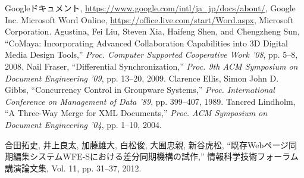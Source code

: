\renewcommand{\bibname}{参考文献}
\begin{thebibliography}{Longest9}

Googleドキュメント, \url{https://www.google.com/intl/ja_jp/docs/about/}, Google Inc.
Microsoft Word Online, \url{https://office.live.com/start/Word.aspx}, Microsoft Corporation.
Agustina, Fei Liu, Steven Xia, Haifeng Shen, and Chengzheng Sun, ``CoMaya: Incorporating Advanced Collaboration Capabilities into 3D Digital Media Design Tools,'' {\it Proc. Computer Supported Cooperative Work '08}, pp. 5--8, 2008.
Nail Fraser,	``Differential Synchronization,''  {\it Proc. 9th ACM Symposium on Document Engineering '09}, pp. 13--20, 2009.
Clarence Ellis, Simon John D. Gibbs, ``Concurrency Control in Groupware Systems,'' {\it Proc. International Conference on Management of Data '89}, pp. 399--407, 1989.
Tancred Lindholm, ``A Three-Way Merge for XML Documents,'' {\it Proc. ACM Symposium on Document Engineering '04}, pp. 1--10, 2004.

合田拓史, 井上良太, 加藤雄大, 白松俊, 大囿忠親, 新谷虎松, ``既存Webページ同期編集システムWFE-Sにおける差分同期機構の試作,'' 情報科学技術フォーラム講演論文集, Vol. 11, pp. 31--37, 2012.

\end{thebibliography}
